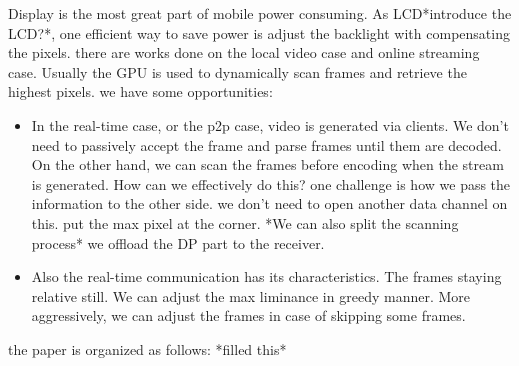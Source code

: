 Display is the most great part of mobile power consuming. As
LCD*introduce the LCD?*, one 
efficient way to save power is adjust the backlight with compensating
the pixels. there are works done on the local video case and online
streaming case. Usually the GPU is used to dynamically scan frames and
retrieve the highest pixels. we have some opportunities:
\begin{itemize}
  \item
    {
      In the real-time case, or the p2p case, video is generated via
      clients. We don't need to passively accept the frame and parse
      frames until them are decoded. On the other hand, we can scan
      the frames before encoding when the stream is
      generated. How can we effectively do this? one challenge is how
      we pass the information to the other side. we
      don't need to open another data channel on this. put the max
      pixel at the corner.
      *We can also split the scanning process*
      we offload the DP part to the receiver.
    }
  \item
    {
        Also the real-time communication has its characteristics. The
        frames staying relative still. We can adjust the max liminance
        in greedy manner. More aggressively, we can adjust the frames
        in case of skipping some frames. 
    }
\end{itemize}

the paper is organized as follows: *filled this*

